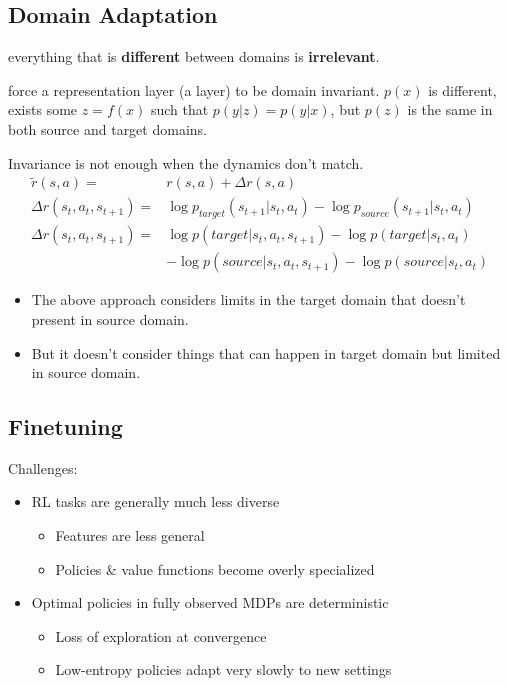 \subsection{Domain Adaptation}
 everything that is \textbf{different} between domains is \textbf{irrelevant}.

 force a representation layer (a layer) to be domain invariant.
$p(x)$ is different, exists some $z=f(x)$ such that $p(y|z) = p(y|x)$, but $p(z)$ is the same in both source and target domains. \cite{tzeng2020adapting}

Invariance is not enough when the dynamics don't match. \cite{eysenbach2020off}
\begin{align*}
	\tilde{r}(s,a) =& r(s,a) + \Delta r(s,a)\\
	\Delta r(s_t, a_t, s_{t+1}) =& \log p_{target}(s_{t+1} | s_t, a_t) - \log p_{source}(s_{t+1} | s_t, a_t)\\
	\Delta r(s_t, a_t, s_{t+1}) =& \log p(target | s_t, a_t, s_{t+1}) - \log p(target | s_t, a_t)\\
	&- \log p(source | s_t, a_t, s_{t+1}) - \log p(source | s_t, a_t)
\end{align*}
\begin{itemize}
	\item The above approach considers limits in the target domain that doesn't present in source domain.
	\item But it doesn't consider things that can happen in target domain but limited in source domain.
\end{itemize}

\subsection{Finetuning}
Challenges:
\begin{itemize}
	\item RL tasks are generally much less diverse
	\begin{itemize}
		\item Features are less general
		\item Policies \& value functions become overly specialized
	\end{itemize}	
	\item Optimal policies in fully observed \ac{MDP}s are deterministic
	\begin{itemize}
		\item Loss of exploration at convergence
		\item Low-entropy policies adapt very slowly to new settings
	\end{itemize}	
\end{itemize}

